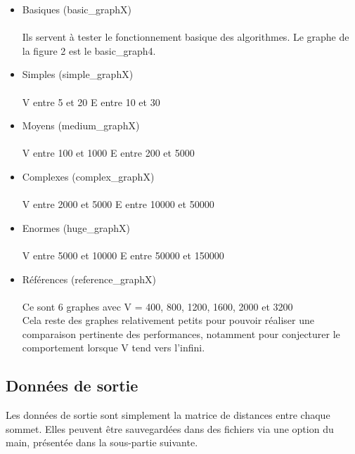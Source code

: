 \documentclass[a4paper,11pt]{article}
\begin{document}
\begin{itemize}
  \item Basiques (basic\_graphX)\\\\
    Ils servent à tester le fonctionnement basique des algorithmes.
    Le graphe de la figure 2 est le basic\_graph4.\\

  \item Simples (simple\_graphX)\\\\
    V entre 5 et 20
    E entre 10 et 30\\

  \item Moyens (medium\_graphX)\\\\
    V entre 100 et 1000
    E entre 200 et 5000\\

  \item Complexes (complex\_graphX)\\\\
    V entre 2000 et 5000
    E entre 10000 et 50000\\

  \item Enormes (huge\_graphX)\\\\
    V entre 5000 et 10000
    E entre 50000 et 150000\\

  \item Références (reference\_graphX)\\\\
    Ce sont 6 graphes avec V = 400, 800, 1200, 1600, 2000 et 3200\\

Cela reste des graphes relativement petits pour pouvoir réaliser une comparaison pertinente des performances, notamment pour conjecturer le comportement lorsque V tend vers l'infini.

\end{itemize}

\subsection{Données de sortie}

Les données de sortie sont simplement la matrice de distances entre chaque sommet. Elles peuvent être sauvegardées dans des fichiers via une option du main, présentée dans la sous-partie suivante.
\end{document}
